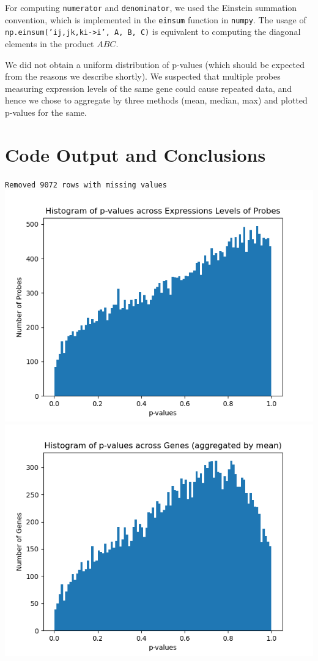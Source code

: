 \documentclass{article}
\begin{document}
For computing \texttt{numerator} and \texttt{denominator}, we used the Einstein summation convention, which is implemented in the \texttt{einsum} function in \texttt{numpy}. The usage of \texttt{np.einsum('ij,jk,ki->i', A, B, C)} is equivalent to computing the diagonal elements in the product $ABC$.

We did not obtain a uniform distribution of p-values (which should be expected from the reasons we describe shortly). We suspected that multiple probes measuring expression levels of the same gene could cause repeated data, and hence we chose to aggregate by three methods (mean, median, max) and plotted p-values for the same.

\section{Code Output and Conclusions}
\texttt{Removed 9072 rows with missing values}\\
\includegraphics{Plot1.png}\\
\includegraphics{Plot2.png}\\
\end{document}
